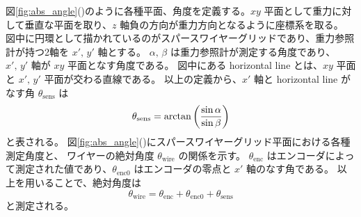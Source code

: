\documentclass[../../main.tex]{subfiles}
\begin{document}
図\ref{fig:abs_angle}()のように各種平面、角度を定義する。$xy$ 平面として重力に対して垂直な平面を取り、$z$ 軸負の方向が重力方向となるように座標系を取る。
図中に円環として描かれているのがスパースワイヤーグリッドであり、重力参照計が持つ2軸を $x',\,y'$ 軸とする。
$\alpha,\,\beta$ は重力参照計が測定する角度であり、$x',\,y'$ 軸が $xy$ 平面となす角度である。
図中にある horizontal line とは、$xy$ 平面と $x',\,y'$ 平面が交わる直線である。
以上の定義から、$x'$ 軸と horizontal line がなす角 $\theta_{\mathrm{sens}}$ は
\begin{equation}
    \theta_{\mathrm{sens}} = \arctan\qty(\dfrac{\sin\alpha}{\sin\beta})
\end{equation}
と表される\cite{swg:Murata_2023}。
図\ref{fig:abs_angle}()にスパースワイヤーグリッド平面における各種測定角度と、
ワイヤーの絶対角度 $\theta_{\mathrm{wire}}$ の関係を示す。
$\theta_{\mathrm{enc}}$ はエンコーダによって測定された値であり、$\theta_{\mathrm{enc}0}$ はエンコーダの零点と $x'$ 軸のなす角である。
以上を用いることで、絶対角度は
\begin{equation}
    \theta_{\mathrm{wire}} = \theta_{\mathrm{enc}} + \theta_{\mathrm{enc}0} + \theta_{\mathrm{sens}}
\end{equation}
と測定される。
\end{document}
